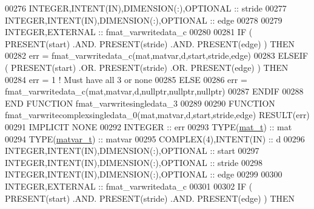 \begin{DoxyCode}
00276     \textcolor{keywordtype}{INTEGER},\textcolor{keywordtype}{INTENT(IN)},\textcolor{keywordtype}{DIMENSION(:)},\textcolor{keywordtype}{OPTIONAL} :: stride
00277     \textcolor{keywordtype}{INTEGER},\textcolor{keywordtype}{INTENT(IN)},\textcolor{keywordtype}{DIMENSION(:)},\textcolor{keywordtype}{OPTIONAL} :: edge
00278 
00279     \textcolor{keywordtype}{INTEGER},\textcolor{keywordtype}{EXTERNAL}                         :: fmat\_varwritedata\_c
00280 
00281     \textcolor{keywordflow}{IF} ( \textcolor{keyword}{PRESENT}(start) .AND. \textcolor{keyword}{PRESENT}(stride) .AND. \textcolor{keyword}{PRESENT}(edge) ) \textcolor{keywordflow}{THEN}
00282         err = fmat\_varwritedata\_c(mat,matvar,d,start,stride,edge)
00283     \textcolor{keywordflow}{ELSEIF} ( \textcolor{keyword}{PRESENT}(start) .OR. \textcolor{keyword}{PRESENT}(stride) .OR. \textcolor{keyword}{PRESENT}(edge) ) \textcolor{keywordflow}{THEN}
00284         err = 1    \textcolor{comment}{! Must have all 3 or none}
00285     \textcolor{keywordflow}{ELSE}
00286         err = fmat\_varwritedata\_c(mat,matvar,d,nullptr,nullptr,nullptr)
00287 \textcolor{keywordflow}{    ENDIF}
00288 \textcolor{keyword}{END FUNCTION }fmat\_varwritesingledata\_3
00289 
00290 \textcolor{keyword}{FUNCTION }fmat\_varwritecomplexsingledata\_0(mat,matvar,d,start,stride,edge) \textcolor{keyword}{RESULT}(err)
00291 \textcolor{keywordtype}{IMPLICIT NONE}
00292     \textcolor{keywordtype}{INTEGER}                                  :: err
00293     \textcolor{keywordtype}{TYPE}(\hyperlink{group___m_a_t_gab0fc888f5a5d79943b16284b1f91c2e8}{mat\_t})                              :: mat
00294     \textcolor{keywordtype}{TYPE}(\hyperlink{group___m_a_t_structmatvar__t}{matvar\_t})                           :: matvar
00295     \textcolor{keywordtype}{COMPLEX(4)},\textcolor{keywordtype}{INTENT(IN)}                :: d
00296     \textcolor{keywordtype}{INTEGER},\textcolor{keywordtype}{INTENT(IN)},\textcolor{keywordtype}{DIMENSION(:)},\textcolor{keywordtype}{OPTIONAL} :: start
00297     \textcolor{keywordtype}{INTEGER},\textcolor{keywordtype}{INTENT(IN)},\textcolor{keywordtype}{DIMENSION(:)},\textcolor{keywordtype}{OPTIONAL} :: stride
00298     \textcolor{keywordtype}{INTEGER},\textcolor{keywordtype}{INTENT(IN)},\textcolor{keywordtype}{DIMENSION(:)},\textcolor{keywordtype}{OPTIONAL} :: edge
00299 
00300     \textcolor{keywordtype}{INTEGER},\textcolor{keywordtype}{EXTERNAL}                         :: fmat\_varwritedata\_c
00301 
00302     \textcolor{keywordflow}{IF} ( \textcolor{keyword}{PRESENT}(start) .AND. \textcolor{keyword}{PRESENT}(stride) .AND. \textcolor{keyword}{PRESENT}(edge) ) \textcolor{keywordflow}{THEN}

\end{DoxyCode}
